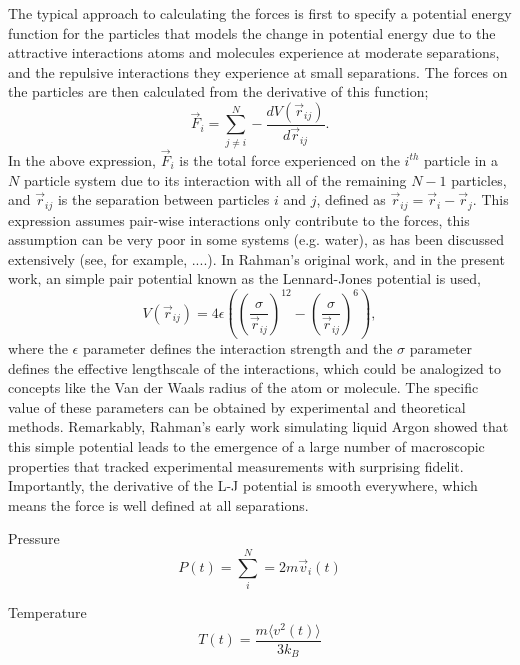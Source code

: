 \documentclass[journal=jpclcd,manuscript=article]{achemso}
\begin{document}
The typical approach to calculating the forces is first to specify a potential energy function for the particles
that models the change in potential energy due to the attractive interactions atoms and molecules experience
at moderate separations, and the repulsive interactions they experience at small separations.  The forces on the particles
are then calculated from the derivative of this function;
\begin{equation}
\vec{F}_i = \sum_{j \neq i}^N - \frac{d V( \vec{r}_{ij}) }{d \vec{r}_{ij}}.
\end{equation}
In the above expression, $\vec{F}_i$ is the total force experienced on the $i^{th}$ particle in a $N$ particle system
due to its interaction with all of the remaining $N-1$ particles, and $\vec{r}_{ij}$ is the separation between
particles $i$ and $j$, defined as $\vec{r}_{ij} = \vec{r}_i - \vec{r}_j$.  This expression assumes pair-wise interactions only contribute to the forces, this assumption
can be very poor in some systems (e.g. water), as has been discussed extensively (see, for example, ....).  
In Rahman's original work, and in the present work, an simple pair potential known as the Lennard-Jones potential 
is used,
\begin{equation}
V( \vec{r}_{ij}) = 4 \epsilon \left( \left( \frac{\sigma}{\vec{r}_{ij}} \right)^{12} - \left(\frac{\sigma}{\vec{r}_{ij}} \right)^6 \right),
\end{equation}
where the $\epsilon$ parameter defines the interaction strength and the $\sigma$ parameter defines the effective
lengthscale of the interactions, which could be analogized to concepts like the Van der Waals radius of the atom or molecule.
The specific value of these parameters can be obtained by experimental and theoretical methods.  Remarkably, Rahman's early
work simulating liquid Argon showed that this simple potential leads to the emergence of a large number of macroscopic properties 
that tracked experimental measurements with surprising fidelit. %
Importantly, the derivative of the L-J potential is smooth everywhere, which means the force is well defined
at all separations.  


Pressure
\begin{equation}
P(t) = \sum_i^N = 2 m \vec{v}_i(t)
\end{equation}

Temperature
\begin{equation}
T(t) = \frac{ m \langle v^2 (t) \rangle }{3 k_B}
\end{equation}
\end{document}
